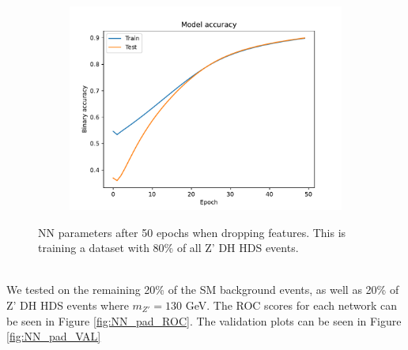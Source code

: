 \documentclass[12pt, a4paper]{book}
\begin{document}
\begin{figure}[!ht]
\begin{subfigure}[b]{0.49\textwidth}
      \includegraphics[width=1\textwidth]{No_pad/Binary_accuracy.pdf}
   \end{subfigure}
   \caption[NN parameters after 50 epochs when dropping features]{NN parameters after 50 epochs when dropping features.  This is training a dataset with 80\% of all Z' DH HDS events.}\label{fig:NN_stats_no_pad}
\end{figure}
\\We tested on the remaining 20\% of the SM background events, as well as 20\% of Z' DH HDS events where $m_{Z'} =130$ GeV. The ROC scores for each network can be seen in Figure \ref{fig:NN_pad_ROC}. The validation plots can be seen in Figure \ref{fig:NN_pad_VAL}
\end{document}
